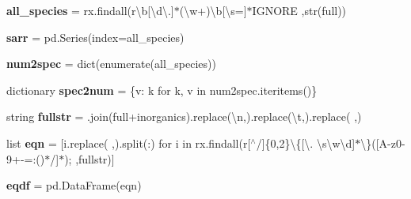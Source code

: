 \begin{DoxyCompactItemize}
\mbox{\label{namespaceMCM__subset_aa0a7b2c274b367c49926dc2d96194d70}} 
{\bfseries all\+\_\+species} = rx.\+findall(r\textquotesingle{}\textbackslash{}b\mbox{[}\textbackslash{}d\textbackslash{}.\mbox{]}$\ast$(\textbackslash{}w+)\textbackslash{}b\mbox{[}\textbackslash{}s=\mbox{]}$\ast$I\+G\+N\+O\+RE\textquotesingle{} ,str(full))
\item 
\mbox{\label{namespaceMCM__subset_a56ea7d881cc071fbab5561cfefe7ce64}} 
{\bfseries sarr} = pd.\+Series(index=all\+\_\+species)
\item 
\mbox{\label{namespaceMCM__subset_a4653f27b3fa3778790844e801bdec05f}} 
{\bfseries num2spec} = dict(enumerate(all\+\_\+species))
\item 
\mbox{\label{namespaceMCM__subset_abeb5ded13e36856ae48e2c746695a4e1}} 
dictionary {\bfseries spec2num} = \{v\+: k for k, v in num2spec.\+iteritems()\}
\item 
\mbox{\label{namespaceMCM__subset_a8159a981676126b362c9ed87ff09afc4}} 
string {\bfseries fullstr} = \textquotesingle{}\textquotesingle{}.join(full+inorganics).replace(\textquotesingle{}\textbackslash{}n\textquotesingle{},\textquotesingle{}\textquotesingle{}).replace(\textquotesingle{}\textbackslash{}t\textquotesingle{},\textquotesingle{}\textquotesingle{}).replace(\textquotesingle{} \textquotesingle{},\textquotesingle{}\textquotesingle{})
\item 
\mbox{\label{namespaceMCM__subset_a84d5a9db9ceb0bb1f48b8be00254fc2a}} 
list {\bfseries eqn} = \mbox{[}i.\+replace(\textquotesingle{} \textquotesingle{},\textquotesingle{}\textquotesingle{}).split(\textquotesingle{}\+:\textquotesingle{}) for i in rx.\+findall(r\textquotesingle{}\mbox{[}$^\wedge$/\mbox{]}\{0,2\}\textbackslash{}\{\mbox{[}\textbackslash{}. \textbackslash{}s\textbackslash{}w\textbackslash{}d\mbox{]}$\ast$\textbackslash{}\}(\mbox{[}A-\/z0-\/9+-\/=\+:()$\ast$/\mbox{]}$\ast$);\textquotesingle{} ,fullstr)\mbox{]}
\item 
\mbox{\label{namespaceMCM__subset_a89c4f6b1a9a45b6d33d55df1852cecfa}} 
{\bfseries eqdf} = pd.\+Data\+Frame(eqn)
\item 

\end{DoxyCompactItemize}
